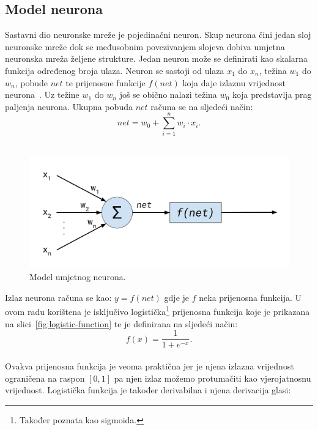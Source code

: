 \subsection{Model neurona}
\label{subsec:model-neurona}
Sastavni dio neuronske mreže je pojedinačni neuron. Skup neurona čini jedan sloj neuronske mreže dok se međusobnim
povezivanjem slojeva dobiva umjetna neuronska mreža željene strukture. Jedan neuron može se definirati kao skalarna
funkcija određenog broja ulaza. Neuron se sastoji od ulaza $x_1$ do $x_n$, težina $w_1$ do $w_n$, pobude $net$ te
prijenosne funkcije $f(net)$ koja daje izlaznu vrijednost neurona\ \citep{cupic2013}. Uz težine $w_1$ do $w_n$ još se
obično nalazi težina $w_0$ koja predstavlja prag paljenja neurona. Ukupna pobuda $net$ računa se na sljedeći način:\\
\begin{equation*}
    net = w_0 + \sum_{i = 1}^{n} w_i \cdot x_i.
\end{equation*}
\\
\begin{figure}[htb]
    \centering
    \includegraphics[width=12cm]{images/chapter3/artificial-neuron-model.pdf}
    \caption{Model umjetnog neurona.}
    \label{fig:model-umjetnog-neurona}
\end{figure}
Izlaz neurona računa se kao: $y = f(net)$ gdje je $f$ neka prijenosna funkcija. U ovom radu korištena je isključivo
logistička\footnote{Također poznata kao sigmoida.} prijenosna funkcija koje je prikazana na
slici\ \ref{fig:logistic-function} te je definirana na sljedeći način:\\
\begin{equation*}
    f(x) = \frac{1}{1 + e^{-x}}.
\end{equation*}
\\
Ovakva prijenosna funkcija je veoma praktična jer je njena izlazna vrijednost ograničena na raspon $[0, 1]$ pa njen
izlaz možemo protumačiti kao vjerojatnosnu vrijednost. Logistička funkcija je također derivabilna i njena derivacija
glasi:\\
